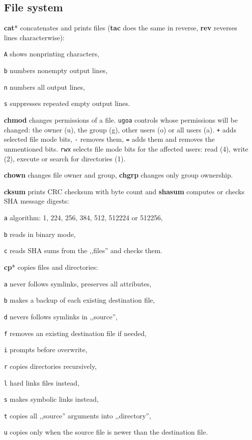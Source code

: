 \subsection{File system}
\textbf{cat}* concatenates and prints files
(\textbf{tac} does the same in reverse, %
\textbf{rev} reverses lines characterwise):
\begin{enumx}
		\item [\texttt{A}] shows nonprinting characters,
		\item [\texttt{b}] numbers nonempty output lines,
		\item [\texttt{n}] numbers all output lines,
		\item [\texttt{s}] suppresses repeated empty output lines.
\end{enumx}

\textbf{chmod} changes permissions of a file.
\texttt{ugoa} controls whose permissions will be changed: 
the owner (u), the group (g), other users (o) or all users (a).
\texttt{+} adds selected file mode bits, \texttt{-} removes them, 
\texttt{=} adds them and removes the unmentioned bits.
\texttt{rwx} selects file mode bits for the affected users: 
read (4), write (2), execute or search for directories (1).

\textbf{chown} changes file owner and group,
\textbf{chgrp} changes only group ownership.

\textbf{cksum} prints CRC checksum with byte count and 
\textbf{shasum} computes or checks SHA message digests:
\begin{enumx}
	\item [\texttt{a}] algorithm: 1, 224, 256, 384, 512, 512224 or 512256,
	\item [\texttt{b}] reads in binary mode,
	\item [\texttt{c}] reads SHA sums from the ,,files'' and checks them.
\end{enumx}

\textbf{cp}* copies files and directories:
\begin{enumx}
	\item [\texttt{a}] never follows symlinks, preserves all attributes,
	\item [\texttt{b}] makes a backup of each existing destination file,
	\item [\texttt{d}] nevers follows symlinks in ,,source'',
	\item [\texttt{f}] removes an existing destination file if needed,
	\item [\texttt{i}] prompts before overwrite,
	\item [\texttt{r}] copies directories recursively,
	\item [\texttt{l}] hard links files instead,
	\item [\texttt{s}] makes symbolic links instead,
	\item [\texttt{t}] copies all ,,source'' arguments into ,,directory'',
	\item [\texttt{u}] copies only when the source file
	 is newer than the destination file.
\end{enumx}

